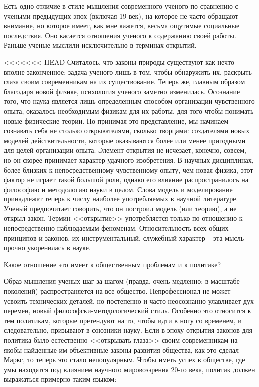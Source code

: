 \documentclass{book}
\begin{document}
Есть одно отличие в стиле мышления современного ученого по сравнению с учеными предыдущих эпох (включая 19 век), на которое не часто обращают внимание, но которое имеет, как мне кажется, весьма ощутимые социальные последствия. Оно касается отношения ученого к содержанию своей работы. Раньше ученые мыслили исключительно в терминах открытий. 

<<<<<<< HEAD
Считалось, что законы природы существуют как нечто вполне законченное; задача ученого лишь в том, чтобы обнаружить их, раскрыть глаза своим современникам на их существование. Теперь же, главным образом благодаря новой физике, психо­логия ученого заметно изменилась. Осознание того, что наука является лишь определенным способом организации чувственного опыта, оказалось необходимым физикам для их работы, для того чтобы понимать новые физические теории. Но прини­мая это представление, мы начинаем сознавать себя не столько открывателями, сколько творцами: создателями новых моде­лей действительности, которые оказываются более или менее пригодными для целей организации опыта. Элемент открытия не исчезает, конечно, совсем, но он скорее принимает характер удачного изобретения.  В научных дисциплинах, более близких к непосредственному чувственному опыту, чем новая физика, этот фактор не играет такой большой роли, однако его влияние распространилось на философию и методологию науки в целом. Слова модель  и моделирование  принадлежат теперь к числу наиболее употребляемых в научной литературе. Ученый пред­почитает говорить, что он построил модель (или теорию),  а не открыл закон.  Термин <<открытие>> употребляется только по от­ношению к непосредственно наблюдаемым феноменам. Относи­тельность всех общих принципов и законов, их инструменталь­ный, служебный характер -- эта мысль прочно укоренилась в науке.

Какое отношение это имеет к общественным проблемам и к политике?

Образ мышления ученых шаг за шагом (правда, очень мед­ленно: в масштабе поколений) распространяется на все общест­во. Непрофессионал не может усвоить технических деталей, но постепенно и часто неосознанно улавливает дух перемен, новый философски‑методологический стиль. Особенно это относится к тем политикам, которые претендуют на то, чтобы идти в ногу со временем, и следовательно, призывают в союзники науку. Если в эпоху открытия законов для политика было естественно <<открывать глаза>> своим современникам на якобы найден­ные им объективные законы развития общества, как это сделал Маркс, то теперь это стало непопулярным. Чтобы иметь успех в обществе, где умы находятся под влиянием научного мировоззрения 20‑го века, политик должен выражаться примерно таким языком:
\end{document}
